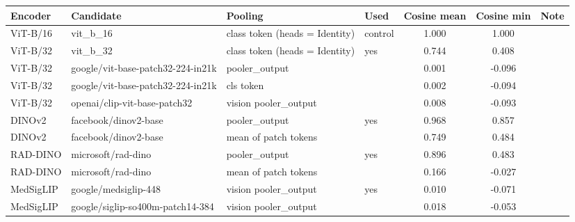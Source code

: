 \begin{tabular}{llllccl}
\toprule
Encoder & Candidate & Pooling & Used & Cosine mean & Cosine min & Note \\
\midrule
ViT-B/16 & vit\_b\_16 & class token (heads = Identity) & control & 1.000 & 1.000 &  \\
ViT-B/32 & vit\_b\_32 & class token (heads = Identity) & yes & 0.744 & 0.408 &  \\
ViT-B/32 & google/vit-base-patch32-224-in21k & pooler\_output &  & 0.001 & -0.096 &  \\
ViT-B/32 & google/vit-base-patch32-224-in21k & cls token &  & 0.002 & -0.094 &  \\
ViT-B/32 & openai/clip-vit-base-patch32 & vision pooler\_output &  & 0.008 & -0.093 &  \\
DINOv2 & facebook/dinov2-base & pooler\_output & yes & 0.968 & 0.857 &  \\
DINOv2 & facebook/dinov2-base & mean of patch tokens &  & 0.749 & 0.484 &  \\
RAD-DINO & microsoft/rad-dino & pooler\_output & yes & 0.896 & 0.483 &  \\
RAD-DINO & microsoft/rad-dino & mean of patch tokens &  & 0.166 & -0.027 &  \\
MedSigLIP & google/medsiglip-448 & vision pooler\_output & yes & 0.010 & -0.071 &  \\
MedSigLIP & google/siglip-so400m-patch14-384 & vision pooler\_output &  & 0.018 & -0.053 &  \\
\bottomrule
\end{tabular}
